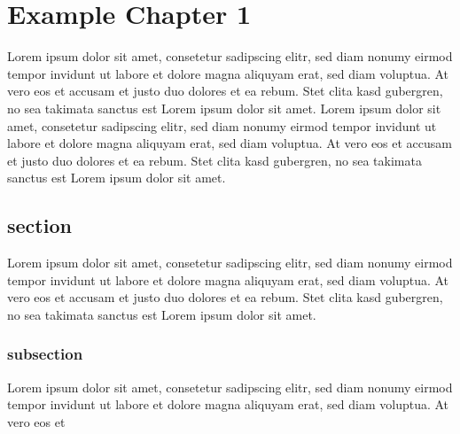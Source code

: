 \chapter{Example Chapter 1}	
Lorem ipsum dolor sit amet, consetetur sadipscing elitr, sed diam nonumy eirmod tempor invidunt ut labore et dolore magna aliquyam erat, sed diam voluptua. At vero eos et accusam et justo duo dolores et ea rebum. Stet clita kasd gubergren, no sea takimata sanctus est Lorem ipsum dolor sit amet. Lorem ipsum dolor sit amet, consetetur sadipscing elitr, sed diam nonumy eirmod tempor invidunt ut labore et dolore magna aliquyam erat, sed diam voluptua. At vero eos et accusam et justo duo dolores et ea rebum. Stet clita kasd gubergren, no sea takimata sanctus est Lorem ipsum dolor sit amet.

\section{section}
Lorem ipsum dolor sit amet, consetetur sadipscing elitr, sed diam nonumy eirmod tempor invidunt ut labore et dolore magna aliquyam erat, sed diam voluptua. At vero eos et accusam et justo duo dolores et ea rebum. Stet clita kasd gubergren, no sea takimata sanctus est Lorem ipsum dolor sit amet.

\subsection{subsection}
Lorem ipsum dolor sit amet, consetetur sadipscing elitr, sed diam nonumy eirmod tempor invidunt ut labore et dolore magna aliquyam erat, sed diam voluptua. At vero eos et

\newpage